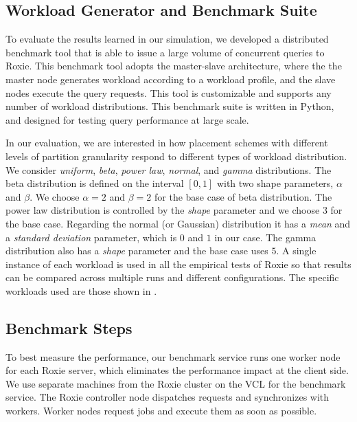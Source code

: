 \subsection{Workload Generator and Benchmark Suite}

To evaluate the results learned in our simulation, we developed a
distributed benchmark tool 
that is able to issue a large volume of concurrent queries to
Roxie. 
This benchmark tool adopts the master-slave architecture, where
the the master node generates workload according to a workload profile, and
the slave nodes execute the query requests.
This tool is customizable and supports any number of
workload distributions.
This benchmark suite is written in Python, and designed for testing
query performance at large scale.

In our evaluation, we are interested in how placement schemes
with different levels of partition granularity
respond to different types of workload distribution.
We consider \emph{uniform}, \emph{beta}, \emph{power law}, \emph{normal}, and \emph{gamma} distributions.
The beta distribution is defined on the interval $[0, 1]$ with
two shape parameters, $\alpha$ and $\beta$.
We choose $\alpha=2$ and $\beta=2$ for the base case of beta distribution. 
The power law distribution is controlled by the
\emph{shape} parameter and we choose $3$ for the base case.
Regarding the normal (or Gaussian) distribution it has a
\emph{mean} and a \emph{standard deviation} parameter, which is
$0$ and $1$ in our case.
The gamma distribution also has a \emph{shape} parameter and the base case
uses $5$.
A single instance of each workload is used in all the empirical tests
of Roxie so that results can be compared across multiple runs and
different configurations.
The specific workloads used are those shown in
\mytable{\ref{tab:load-imbalance}}.


\subsection{Benchmark Steps}

To best measure the performance, our benchmark service runs
one worker node for each Roxie server, which 
eliminates the performance impact at the client side.
We use separate machines from the Roxie cluster on the VCL for the benchmark service.
The Roxie controller node dispatches requests and synchronizes with workers.
Worker nodes request jobs and execute them as soon as possible.


